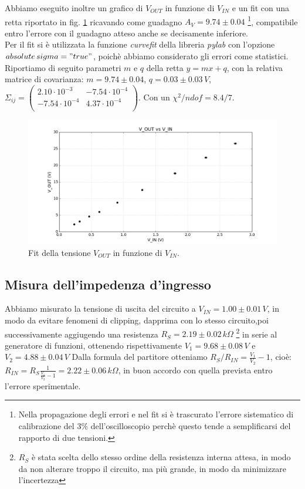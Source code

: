 \documentclass[10pt,a4paper]{article}
\begin{document}
Abbiamo eseguito inoltre un grafico di $V_{OUT}$ in funzione di $V_{IN}$ e un fit con una retta riportato in fig. \ref{rettaGuadagno} ricavando come guadagno $A_V=9.74\pm0.04$ \footnote{Nella propagazione degli errori e nel fit si è trascurato l'errore sistematico di calibrazione del  $3\%$ dell'oscilloscopio perchè questo tende a semplificarsi del rapporto di due tensioni.}, compatibile entro l'errore con il guadagno atteso anche se decisamente inferiore.\\

Per il fit si è utilizzata la funzione \emph{curvefit} della libreria \emph{pylab} con l'opzione \emph{$absolute\,sigma = "true"$}, poichè abbiamo considerato gli errori come statistici. Riportiamo di seguito parametri $m$ e $q$ della retta $y=mx+q$, con la relativa matrice di covarianza: $m = 9.74 \pm 0.04$, $q = 0.03\pm 0.03 \, V$,  $ \Sigma_{ij} = \left( \begin{array}{cc}
2.10 \cdot 10^{-3} & -7.54 \cdot 10^{-4} \\ 
-7.54 \cdot 10^{-4} & 4.37 \cdot 10^{-4}\\
\end{array} \right)$. Con un $\chi^2/ndof = 8.4/7$.\\


\begin{figure}[!htb]
  \centering
  \includegraphics[scale=0.5]{plotGuadagno.png}
\caption{Fit della tensione $V_{OUT}$ in funzione di $V_{IN}$.}
\label{rettaGuadagno}
\end{figure}

\subsection{Misura dell'impedenza d'ingresso}
Abbiamo misurato la tensione di uscita del circuito a $V_{IN}=1.00 \pm 0.01 \, V$, in modo da evitare fenomeni di clipping, dapprima con lo stesso circuito,poi successivamente aggiugendo una resistenza $R_S=2.19 \pm 0.02 \, k \Omega$ \footnote{$R_S$ è stata scelta dello stesso ordine della resistenza interna attesa, in modo da non alterare troppo il circuito, ma più grande, in modo da minimizzare l'incertezza} in serie al generatore di funzioni, ottenendo rispettivamente $V_1=9.68 \pm 0.08 \, V$ e $V_2= 4.88 \pm 0.04 \, V$ Dalla formula del partitore otteniamo $R_S/R_{IN}=\frac{V_1}{V_2}-1$, cioè:
$R_{IN} = R_S \frac{1}{\frac{V_1}{V_2}-1} = 2.22 \pm 0.06 \, k \Omega$, in buon accordo con quella prevista entro l'errore sperimentale.
\end{document}
